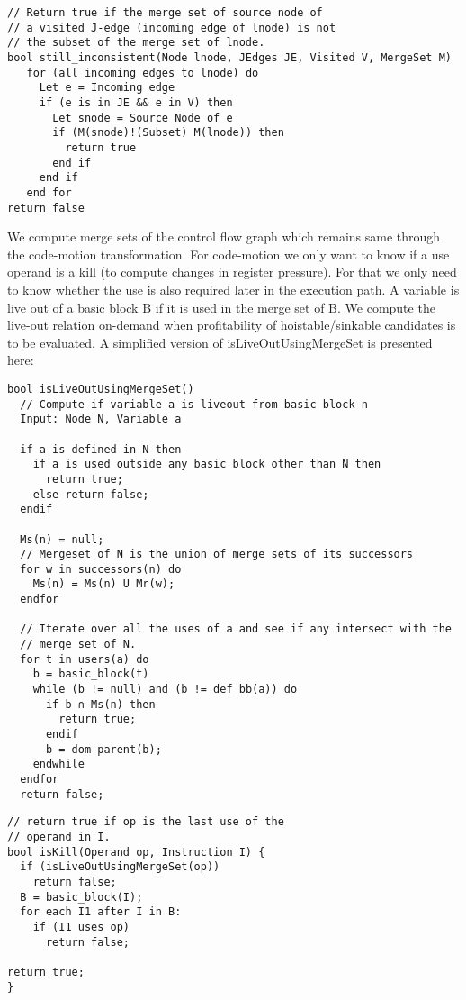 \documentclass[acmlarge,review]{acmart}\settopmatter{printfolios=true}
\begin{document}
\begin{verbatim}
// Return true if the merge set of source node of
// a visited J-edge (incoming edge of lnode) is not
// the subset of the merge set of lnode.
bool still_inconsistent(Node lnode, JEdges JE, Visited V, MergeSet M)
   for (all incoming edges to lnode) do
     Let e = Incoming edge
     if (e is in JE && e in V) then
       Let snode = Source Node of e
       if (M(snode)!(Subset) M(lnode)) then
         return true
       end if
     end if
   end for
return false
\end{verbatim}


We compute merge sets of the control flow graph which remains same through the
code-motion transformation. For code-motion we only want to know if a use
operand is a kill (to compute changes in register pressure). For that we only
need to know whether the use is also required later in the execution path. A
variable is live out of a basic block B if it is used in the merge set of B. We
compute the live-out relation on-demand when profitability of hoistable/sinkable
candidates is to be evaluated. A simplified version of isLiveOutUsingMergeSet is
presented here:

\begin{verbatim}
bool isLiveOutUsingMergeSet()
  // Compute if variable a is liveout from basic block n
  Input: Node N, Variable a

  if a is defined in N then
    if a is used outside any basic block other than N then
      return true;
    else return false;
  endif

  Ms(n) = null;
  // Mergeset of N is the union of merge sets of its successors
  for w in successors(n) do
    Ms(n) = Ms(n) U Mr(w);
  endfor

  // Iterate over all the uses of a and see if any intersect with the
  // merge set of N.
  for t in users(a) do
    b = basic_block(t)
    while (b != null) and (b != def_bb(a)) do
      if b ∩ Ms(n) then
        return true;
      endif
      b = dom-parent(b);
    endwhile
  endfor
  return false;
\end{verbatim}

\begin{verbatim}
// return true if op is the last use of the
// operand in I.
bool isKill(Operand op, Instruction I) {
  if (isLiveOutUsingMergeSet(op))
    return false;
  B = basic_block(I);
  for each I1 after I in B:
    if (I1 uses op)
      return false;

return true;
}
\end{verbatim}
\end{document}

